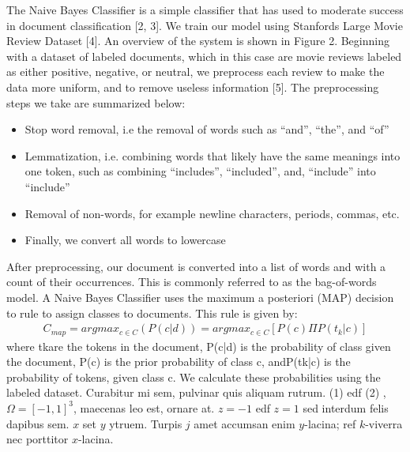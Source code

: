 \documentclass[a0,portrait]{a0poster}
\begin{document}
\begin{multicols}{2}
The Naive Bayes Classifier is a simple classifier that has used to moderate success in document classification [2, 3]. We train our model using Stanfords Large Movie Review Dataset [4]. An overview of the system is shown in Figure 2.
\newline
\newline
Beginning with a dataset of labeled documents, which in this case are movie reviews labeled as either positive, negative, or neutral, we preprocess each review to make the data more uniform, and to remove useless information [5]. The preprocessing steps we take are summarized below:
\newline
\begin{itemize}
\item Stop word removal, i.e the removal of words such as “and”,  “the”, and “of”
\item Lemmatization, i.e. combining words that likely have the same meanings into one token, such as combining “includes”, “included”, and, “include” into “include”
\item Removal of non-words, for example newline characters, periods, commas, etc.
\item Finally, we convert all words to lowercase
\end{itemize}
\leavevmode
\newline
After preprocessing, our document is converted into a list of words and with a count of their occurrences. This is commonly referred to as the bag-of-words model. 
\newline
\newline
A Naive Bayes Classifier uses the maximum a posteriori (MAP) decision to rule to assign classes to documents. This rule is given by:
\begin{eqnarray}
C_{map} = argmax_{c\in C} (P(c|d)) = argmax_{c\in C}[P(c)\Pi P(t_k |c)]
\label{eqn:Equation 1}
\end{eqnarray}
where tkare the tokens in the document, P(c|d) is the probability of class given the document, P(c) is the prior probability of class c, andP(tk|c) is the probability of tokens, given class c. We calculate these probabilities using the labeled dataset. 
\newline
\newline
Curabitur mi sem, pulvinar quis aliquam rutrum. (1) edf (2)
, $\Omega=[-1,1]^3$, maecenas leo est, ornare at. $z=-1$ edf $z=1$ sed interdum felis dapibus sem. $x$ set $y$ ytruem. 
Turpis $j$ amet accumsan enim $y$-lacina; 
ref $k$-viverra nec porttitor $x$-lacina. 


\end{multicols}
\end{document}
